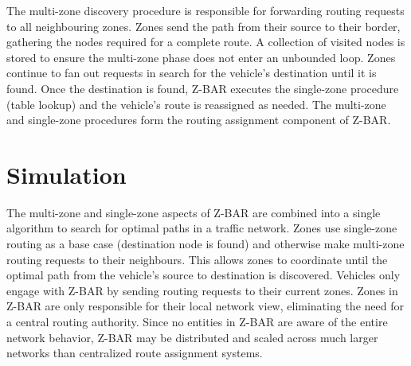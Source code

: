\documentclass[conference]{IEEEtran}
\begin{document}



The multi-zone discovery procedure is responsible for forwarding routing requests to all neighbouring zones. Zones send the path from their source to their border, gathering the nodes required for a complete route. A collection of visited nodes is stored to ensure the multi-zone phase does not enter an unbounded loop. Zones continue to fan out requests in search for the vehicle's destination until it is found. Once the destination is found, Z-BAR executes the single-zone procedure (table lookup) and the vehicle's route is reassigned as needed. The multi-zone and single-zone procedures form the routing assignment component of Z-BAR.

\section{Simulation}

The multi-zone and single-zone aspects of Z-BAR are combined into a single algorithm to search for optimal paths in a traffic network. Zones use single-zone routing as a base case (destination node is found) and otherwise make multi-zone routing requests to their neighbours. This allows zones to coordinate until the optimal path from the vehicle's source to destination is discovered. Vehicles only engage with Z-BAR by sending routing requests to their current zones. Zones in Z-BAR are only responsible for their local network view, eliminating the need for a central routing authority. Since no entities in Z-BAR are aware of the entire network behavior, Z-BAR may be distributed and scaled across much larger networks than centralized route assignment systems.
\end{document}
